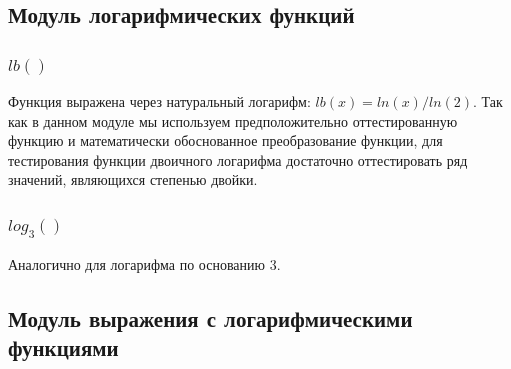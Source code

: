 \documentclass[a4paper,10pt]{article}
\begin{document}
    \subsection*{Модуль логарифмических функций}
		\subsubsection*{$lb()$}

    		Функция выражена через натуральный логарифм: $lb(x) = ln(x)/ln(2)$.
    		Так как в данном модуле мы используем предположительно оттестированную функцию и математически обоснованное
    		преобразование функции, для тестирования функции двоичного логарифма достаточно оттестировать ряд значений,
    		являющихся степенью двойки.
		\subsubsection*{$log_3()$}
			Аналогично для логарифма по основанию 3.

    \subsection*{Модуль выражения с логарифмическими функциями}
\end{document}
